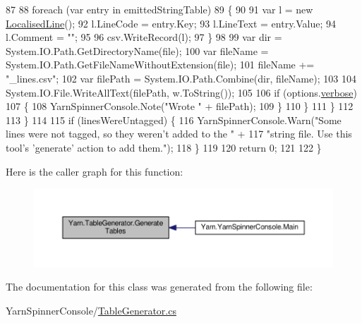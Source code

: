 \begin{DoxyCode}
87 
88                         \textcolor{keywordflow}{foreach} (var entry \textcolor{keywordflow}{in} emittedStringTable)
89                         \{
90 
91                             var l = \textcolor{keyword}{new} \hyperlink{a00124}{LocalisedLine}();
92                             l.LineCode = entry.Key;
93                             l.LineText = entry.Value;
94                             l.Comment = \textcolor{stringliteral}{""};
95 
96                             csv.WriteRecord(l);
97                         \}
98 
99                         var dir = System.IO.Path.GetDirectoryName(file);
100                         var fileName = System.IO.Path.GetFileNameWithoutExtension(file);
101                         fileName += \textcolor{stringliteral}{"\_lines.csv"};
102                         var filePath = System.IO.Path.Combine(dir, fileName);
103 
104                         System.IO.File.WriteAllText(filePath, w.ToString());
105 
106                         \textcolor{keywordflow}{if} (options.\hyperlink{a00031_ada4d83d1756918f362d55f6649b82b17}{verbose})
107                         \{
108                             YarnSpinnerConsole.Note(\textcolor{stringliteral}{"Wrote "} + filePath);
109                         \}
110                     \}
111                 \}
112 
113             \}
114 
115             \textcolor{keywordflow}{if} (linesWereUntagged) \{
116                 YarnSpinnerConsole.Warn(\textcolor{stringliteral}{"Some lines were not tagged, so they weren't added to the "} +
117                                \textcolor{stringliteral}{"string file. Use this tool's 'generate' action to add them."});
118             \}
119 
120             \textcolor{keywordflow}{return} 0;
121 
122         \}
\end{DoxyCode}


Here is the caller graph for this function\-:
\nopagebreak
\begin{figure}[H]
\begin{center}
\leavevmode
\includegraphics[width=350pt]{a00159_a1d65ef643c3f3495cf9480f86172ff87_icgraph}
\end{center}
\end{figure}




The documentation for this class was generated from the following file\-:\begin{DoxyCompactItemize}
\item 
Yarn\-Spinner\-Console/\hyperlink{a00309}{Table\-Generator.\-cs}\end{DoxyCompactItemize}
